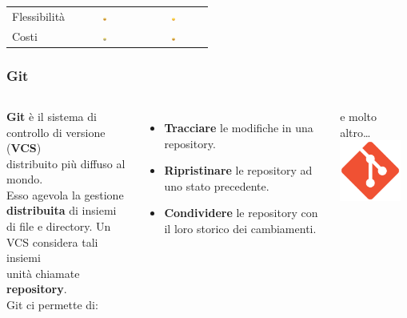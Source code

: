 \documentclass{beamer}
\begin{document}
\begin{frame}
\begin{longtable}{@{}lcc@{}}
		Flessibilità & \includegraphics[width=0.05\textwidth]{joy2.png} & \includegraphics[width=0.05\textwidth]{sad.png}       \\
		Costi        & \includegraphics[width=0.05\textwidth]{sad2.png}         & \includegraphics[width=0.05\textwidth]{joy2.png} \\* \bottomrule
	\end{longtable}
\end{frame}

\begin{frame}
	\frametitle{Git}

	\begin{columns}[T]
		\textbf{Git} è il sistema di controllo di versione (\textbf{VCS}) \\
		distribuito più diffuso al mondo. \\
		Esso agevola la gestione \textbf{distribuita} di insiemi\\di file e directory.
		Un VCS considera tali insiemi\\unità chiamate \textbf{repository}.\\
		Git ci permette di:
		\begin{itemize}
			\item \textbf{Tracciare} le modifiche in una repository.
			\item \textbf{Ripristinare} le repository ad uno stato precedente.
			\item \textbf{Condividere} le repository con il loro storico dei cambiamenti.
		\end{itemize}
		e molto altro\dots
		\hspace*{-2cm}
		\includegraphics[width=2cm]{figures/git.png}
	\end{columns}

\end{frame}
\end{document}
